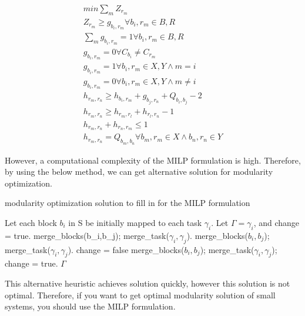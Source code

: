 \documentclass[conference,compsoc]{IEEEtran}
\begin{document}
\begin{eqnarray}
 min \sum_{m} Z_{r_m} \\
 Z_{r_m} \geq g_{b_i,r_m} \forall b_i,r_m \in B,R \\
 \sum_m g_{b_i,r_m} = 1 \forall b_i,r_m \in B,R \\
 g_{b_i,r_m} = 0 \forall C_{b_i} \neq C_{r_m} \\
 g_{b_i,r_m} = 1 \forall b_i,r_m \in X,Y \wedge m = i \\
 g_{b_i,r_m} = 0 \forall b_i,r_m \in X,Y \wedge m \neq i \\
 h_{r_m,r_n} \geq h_{b_i,r_m} + g_{b_j,r_n} + Q_{b_i,b_j} - 2 \\
 h_{r_m,r_n} \geq h_{r_m,r_l} + h_{r_l,r_n} - 1 \\
 h_{r_m,r_n} + h_{r_n,r_m} \leq 1 \\
 h_{r_m,r_n} = Q_{b_m,b_n} \forall b_m,r_m \in X \wedge b_n,r_n \in Y
\end{eqnarray}

 However, a computational complexity of the MILP formulation is high.
Therefore, by using the below method, we can get alternative solution for modularity optimization.   

\begin{algorithm}
\caption{modularity optimization solution to fill in for the MILP formulation}         
\label{alg1}                          
\begin{algorithmic}[1]
\STATE Let each block $b_i$ in S be initially mapped to each task $\gamma_i$.
\STATE Let $\Gamma = {\gamma_i}$, and change = true.
			\STATE merge\_blocks(b\_i,b\_j); merge\_task($\gamma_i,\gamma_j$).
		\ENDIF
	\ENDWHILE
			\STATE merge\_blocks($b_i,b_j$); merge\_task($\gamma_i,\gamma_j$).
		\ENDIF
	\ENDWHILE
	\STATE change = false
		\STATE merge\_blocks($b_i,b_j$); merge\_task($\gamma_i,\gamma_j$); change = true.
	\ENDIF
\ENDWHILE
\RETURN $\Gamma$
\end{algorithmic}
\end{algorithm}

 This alternative heuristic achieves solution quickly, however this solution is not optimal.
Therefore, if you want to get optimal modularity solution of small systems, you should use the MILP formulation.
\end{document}
